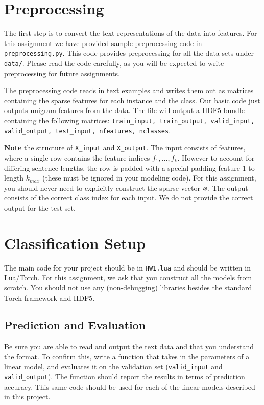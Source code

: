 \documentclass[11pt]{article}
\begin{document}
\section{Preprocessing}

The first step is to convert the text representations of the data into
features. For this assignment we have provided sample preprocessing
code in \texttt{preprocessing.py}. This code provides preprocessing 
for all the data sets under \texttt{data/}. Please read the code
carefully, as you will be expected to write preprocessing for future
assignments.

The preprocessing code reads in text examples and writes them
out as matrices containing the sparse features for each instance and
the class. Our basic code just outputs unigram features from the data.
The file will output a HDF5 bundle containing the following matrices:
\texttt{train\_input, train\_output, valid\_input, valid\_output,
  test\_input, nfeatures, nclasses}.

\textbf{Note} the structure of \texttt{X\_input} and
\texttt{X\_output}. The input consists of features, where a single row
contains the feature indices $f_1, \ldots, f_k$. However to account
for differing sentence lengths, the row is padded with a special
padding feature 1 to length $k_{max}$ (these must be ignored in your modeling
code).  For this assignment, you should never need to explicitly
construct the sparse vector $\boldsymbol{x}$. The output consists of the
correct class index for each input. We do not provide the correct
output for the test set.

\section{Classification Setup}

The main code for your project should be in \texttt{HW1.lua} and
should be written in Lua/Torch. For this assignment, we ask that you
construct all the models from scratch. You should not use any
(non-debugging) libraries besides the standard Torch framework and HDF5.

\subsection{Prediction and Evaluation}

Be sure you are able to read and output the text data and that you
understand the format. To confirm this, write a function that takes in
the parameters of a linear model, and evaluates it on the validation
set (\texttt{valid\_input} and \texttt{valid\_output}).  The function
should report the results in terms of prediction accuracy. This same
code should be used for each of the linear models described in this
project.
\end{document}
